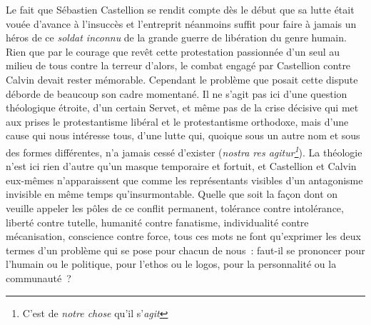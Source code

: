 \documentclass[french,twoside]{book} %
\newcommand\foreign[1]{\emph{#1}}
\begin{document}
Le fait que Sébastien Castellion se rendit compte dès le début que sa lutte était vouée d’avance à l’insuccès et l’entreprit néanmoins suffit pour faire à jamais un héros de ce \emph{soldat inconnu} de la grande guerre de libération du genre humain. Rien que par le courage que revêt cette protestation passionnée d’un seul au milieu de tous contre la terreur d’alors, le combat engagé par Castellion contre Calvin devait rester mémorable. Cependant le problème que posait cette dispute déborde de beaucoup son cadre momentané. Il ne s’agit pas ici d’une question théologique étroite, d’un certain Servet, et même pas de la crise décisive qui met aux prises le protestantisme libéral et le protestantisme orthodoxe, mais d’une cause qui nous intéresse tous, d’une lutte qui, quoique sous un autre nom et sous des formes différentes, n’a jamais cessé d’exister (\foreign{nostra res agitur\footnote{C’est de \emph{notre chose} qu’il s’\emph{agit}}}). La théologie n’est ici rien d’autre qu’un masque temporaire et fortuit, et Castellion et Calvin eux-mêmes n’apparaissent que comme les représentants visibles d’un antagonisme invisible en même temps qu’insurmontable. Quelle que soit la façon dont on veuille appeler les pôles de ce conflit permanent, tolérance contre intolérance, liberté contre tutelle, humanité contre fanatisme, individualité contre mécanisation, conscience contre force, tous ces mots ne font qu’exprimer les deux termes d’un problème qui se pose pour chacun de nous : faut-il se prononcer pour l’humain ou le politique, pour l’ethos ou le logos, pour la personnalité ou la communauté ?\par
\end{document}
